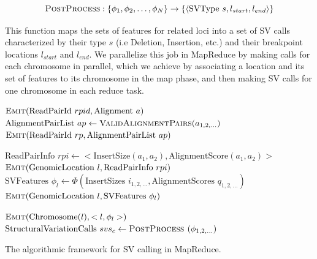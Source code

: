 \[ \textsc{PostProcess} : \left\{\phi_1,\phi_2,\ldots,\phi_N\right\} \rightarrow \left\{\langle  \textrm{SVType } s, l_{start}, l_{end} \rangle\right\} \]

This function maps the sets of features for related loci into a set of SV calls characterized by their type $s$ (i.e Deletion, Insertion, etc.) and their breakpoint locations $l_{start}$ and $l_{end}$. We parallelize this job in MapReduce by making calls for each chromosome in parallel, which we achieve by associating a location and its set of features to its chromosome in the map phase, and then making SV calls for one chromosome in each reduce task.

\begin{algorithm}
\algrenewcommand{}
 \begin{algorithmic}[1]
 \State $\textsc{Emit}(\textrm{ReadPairId }rpid, \textrm{Alignment }a)$
 \EndFor
 \EndFunction
 \State $\textrm{AlignmentPairList }ap \gets \textsc{ValidAlignmentPairs}(a_{1,2,\ldots})$
 \State $\textsc{Emit}(\textrm{ReadPairId }rp, \textrm{AlignmentPairList } ap)$
 \EndFunction
 \EndProcedure

 \State $ \textrm{ReadPairInfo }rpi \gets <\textrm{InsertSize}(a_1,a_2), \textrm{AlignmentScore}(a_1,a_2)>$
 \State $\textsc{Emit}(\textrm{GenomicLocation }l, \textrm{ReadPairInfo }rpi)$
 \EndFor
 \EndFor
 \EndFunction
 \State $\textrm{SVFeatures } \phi_l \gets \Phi(\textrm{InsertSizes }i_{1,2,\ldots}, \textrm{AlignmentScores }q_{1,2,\ldots})$
 \State $\textsc{Emit}(\textrm{GenomicLocation }l, \textrm{SVFeatures } \phi_l)$
 \EndFunction
 \EndProcedure

 \State $\textsc{Emit}(\textrm{Chromosome}(l), <l,\phi_l>)$
 \EndFunction
 \State $\textrm{StructuralVariationCalls } svs_c \gets \textsc{PostProcess }(\phi_{1,2,\ldots})$
 \EndFunction
 \EndProcedure
 \end{algorithmic}
\caption{The algorithmic framework for SV calling in MapReduce.}
\label{cb_algo}
\end{algorithm}

